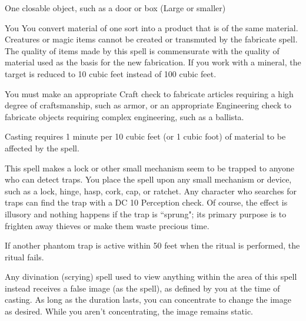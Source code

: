 \begin{spelltarget}{One closable object, such as a door or box (Large or smaller)}
\begin{spelltarget}{You}
\spelleffect You convert material of one sort into a product that is of the same material. Creatures or magic items cannot be created or transmuted by the fabricate spell. The quality of items made by this spell is commensurate with the quality of material used as the basis for the new fabrication. If you work with a mineral, the target is reduced to 10 cubic feet instead of 100 cubic feet.
\par You must make an appropriate Craft check to fabricate articles requiring a high degree of craftsmanship, such as armor, or an appropriate Engineering check to fabricate objects requiring complex engineering, such as a ballista.
\par Casting requires 1 minute per 10 cubic feet (or 1 cubic foot) of material to be affected by the spell.

\spelleffect This spell makes a lock or other small mechanism seem to be trapped to anyone who can detect traps. You place the spell upon any small mechanism or device, such as a lock, hinge, hasp, cork, cap, or ratchet. Any character who searches for traps can find the trap with a DC 10 Perception check. Of course, the effect is illusory and nothing happens if the trap is ``sprung"; its primary purpose is to frighten away thieves or make them waste precious time.
\par If another phantom trap is active within 50 feet when the ritual is performed, the ritual fails.

\spelldur{\durext \dismissable}
\spelleffect Any divination (scrying) spell used to view anything within the area of this spell instead receives a false image (as the  spell), as defined by you at the time of casting. As long as the duration lasts, you can concentrate to change the image as desired. While you aren't concentrating, the image remains static.


\end{spelltarget}
\end{spelltarget}
